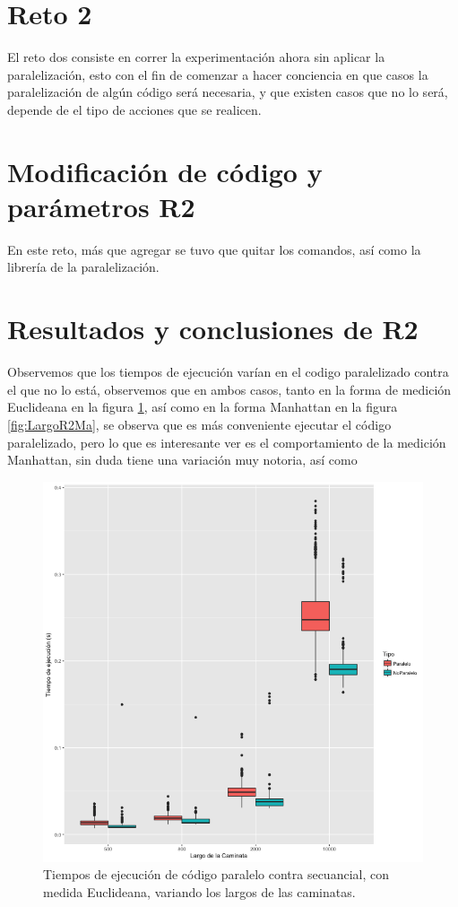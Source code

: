 \documentclass[a4paper]{article}
\begin{document}
\section{Reto 2}
El reto dos consiste en correr la experimentación ahora sin aplicar la paralelización, esto con el fin de comenzar a hacer conciencia en que casos la paralelización de algún código será necesaria, y que existen casos que no lo será, depende de el tipo de acciones que se realicen.

\section{Modificación de código y parámetros R2}
En este reto, más que agregar se tuvo que quitar los comandos, así como la librería de la paralelización.
\section{Resultados y conclusiones de R2}
Observemos que los tiempos de ejecución varían en el codigo paralelizado contra el que no lo está, observemos que en ambos casos, tanto en la forma de medición Euclideana en la figura \ref{fig:LargoR2Eu}, así como en la forma Manhattan en la figura \ref{fig:LargoR2Ma}, se observa que es más conveniente ejecutar el código paralelizado, pero lo que es interesante ver es el comportamiento de la medición Manhattan, sin duda tiene una variación muy notoria, así como 
\begin{figure}[h]
\centering
\includegraphics[width=0.7\linewidth]{LargoR2Eu}
\caption{Tiempos de ejecución de código paralelo contra secuancial, con medida Euclideana, variando los largos de las caminatas.}
\label{fig:LargoR2Eu}
\end{figure}
\end{document}
